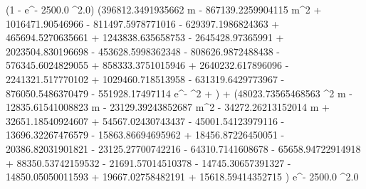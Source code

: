 \left(1 - e^{- 2500.0 \Delta^{2.0}}\right) \left(396812.3491935662 \Delta m - 867139.2259904115 m^{2} + 1016471.90546966 \sin{\left(3 \Delta \right)} - 811497.5978771016 \sin{\left(4 \Delta \right)} - 629397.1986824363  + 465694.5270635661  + 1243838.635658753  - 2645428.97365991  + 2023504.830196698  - 453628.5998362348  - 808626.9872488438 \cos{\left(\Delta \right)} - 576345.6024829055  + 858333.3751015946  + 2640232.617896096  - 2241321.517770102  + 1029460.718513958  - 631319.6429773967  - 876050.5486370479 - 551928.17497114 e^{- \Delta^{2}} + \right) + \left(48023.73565468563 \Delta^{2} m - 12835.61541008823 \Delta m - 23129.39243852687 m^{2} - 34272.26213152014 m + 32651.18540924607  + 54567.02430743437  - 45001.54123979116  - 13696.32267476579  - 15863.86694695962  + 18456.87226450051  - 20386.82031901821  - 23125.27700742216  - 64310.7141608678  - 65658.94722914918  + 88350.53742159532  - 21691.57014510378  - 14745.30657391327  - 14850.05050011593  + 19667.02758482191  + 15618.59414352715 \right) e^{- 2500.0 \Delta^{2.0}}
